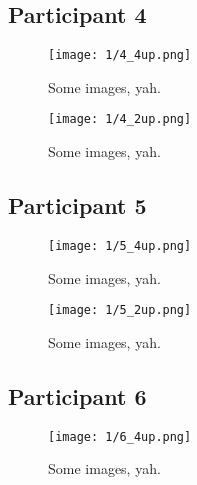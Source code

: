 \subsection{Participant 4}

\begin{figure}[h]
	\begin{center}
	\texttt{[image: 1/4\_4up.png]}
	\caption{Some images, yah.}
	\end{center}
\end{figure}

\clearpage

\begin{figure}[h]
	\begin{center}
	\texttt{[image: 1/4\_2up.png]}
	\caption{Some images, yah.}
	\end{center}
\end{figure}


\subsection{Participant 5}

\clearpage

\begin{figure}[h]
	\begin{center}
	\texttt{[image: 1/5\_4up.png]}
	\caption{Some images, yah.}
	\end{center}
\end{figure}

\clearpage

\begin{figure}[h]
	\begin{center}
	\texttt{[image: 1/5\_2up.png]}
	\caption{Some images, yah.}
	\end{center}
\end{figure}


\subsection{Participant 6}

\clearpage

\begin{figure}[h]
	\begin{center}
	\texttt{[image: 1/6\_4up.png]}
	\caption{Some images, yah.}
	\end{center}
\end{figure}

